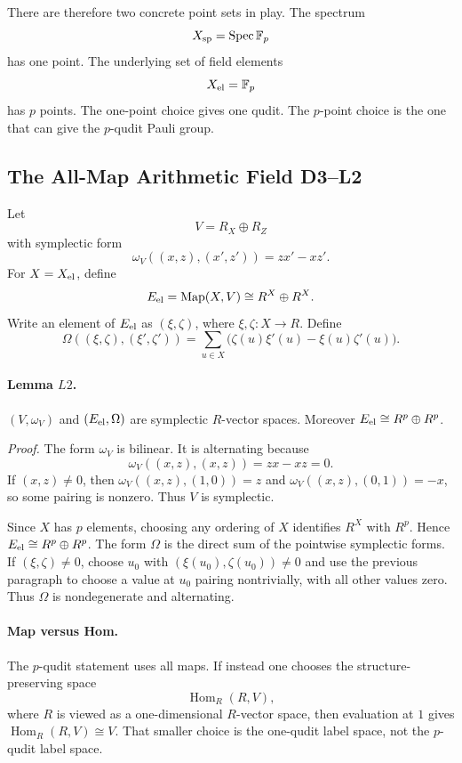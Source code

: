 There are therefore two concrete point sets in play.  The spectrum
\[
  X_{\rm sp}=\operatorname{Spec}\mathbb F_p
\]
has one point.  The underlying set of field elements
\[
  X_{\rm el}=\mathbb F_p
\]
has \(p\) points.  The one-point choice gives one qudit.  The \(p\)-point
choice is the one that can give the \(p\)-qudit Pauli group.

\subsection{The All-Map Arithmetic Field D3--L2}

Let
\[
  V=R_X\oplus R_Z
\]
with symplectic form
\[
  \omega_V((x,z),(x',z'))=zx'-xz'.
\]
For \(X=X_{\rm el}\), define
\[
  E_{\rm el}=\operatorname{Map}(X,V)
  \cong R^X\oplus R^X.
\]
Write an element of \(E_{\rm el}\) as \((\xi,\zeta)\), where
\(\xi,\zeta:X\to R\).  Define
\[
  \Omega((\xi,\zeta),(\xi',\zeta'))
  =
  \sum_{u\in X}\bigl(\zeta(u)\xi'(u)-\xi(u)\zeta'(u)\bigr).
\]

\paragraph{Lemma \(L2\).}
\((V,\omega_V)\) and \((E_{\rm el},\Omega)\) are symplectic \(R\)-vector
spaces.  Moreover \(E_{\rm el}\cong R^p\oplus R^p\).

\emph{Proof.}
The form \(\omega_V\) is bilinear.  It is alternating because
\[
  \omega_V((x,z),(x,z))=zx-xz=0.
\]
If \((x,z)\ne0\), then \(\omega_V((x,z),(1,0))=z\) and
\(\omega_V((x,z),(0,1))=-x\), so some pairing is nonzero.  Thus \(V\) is
symplectic.

Since \(X\) has \(p\) elements, choosing any ordering of \(X\) identifies
\(R^X\) with \(R^p\).  Hence \(E_{\rm el}\cong R^p\oplus R^p\).  The form
\(\Omega\) is the direct sum of the pointwise symplectic forms.  If
\((\xi,\zeta)\ne0\), choose \(u_0\) with \((\xi(u_0),\zeta(u_0))\ne0\) and use
the previous paragraph to choose a value at \(u_0\) pairing nontrivially,
with all other values zero.  Thus \(\Omega\) is nondegenerate and alternating.

\paragraph{Map versus Hom.}
The \(p\)-qudit statement uses all maps.  If instead one chooses the
structure-preserving space
\[
  \operatorname{Hom}_R(R,V),
\]
where \(R\) is viewed as a one-dimensional \(R\)-vector space, then evaluation
at \(1\) gives \(\operatorname{Hom}_R(R,V)\cong V\).  That smaller choice is
the one-qudit label space, not the \(p\)-qudit label space.

